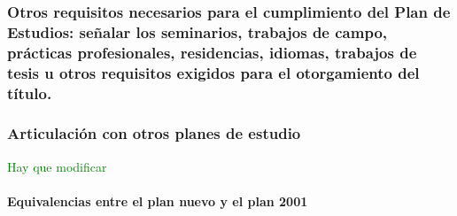 \documentclass[a4paper, 12pt]{article}
\begin{document}
\subsubsection{Otros requisitos necesarios para el cumplimiento del Plan de Estudios: señalar los seminarios, trabajos de campo, prácticas profesionales, residencias, idiomas, trabajos de tesis u otros requisitos exigidos para el otorgamiento del título.} 



\subsubsection{Articulación con otros planes de estudio}

\textcolor{green}{Hay que modificar}

\paragraph{Equivalencias entre el plan nuevo y el plan 2001} \fontsize{11pt}{11pt}\selectfont
\end{document}

